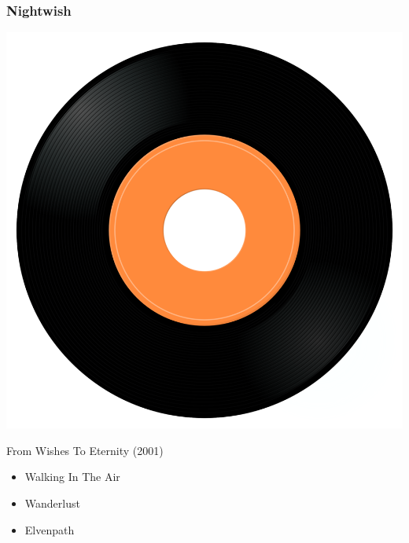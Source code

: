\subsubsection{Nightwish}

\begin{minipage}[t]{0.25\textwidth}
\captionsetup{type=figure}
\includegraphics[width=\textwidth]{Images/cover.png}
\caption*{From Wishes To Eternity (2001)}
\end{minipage}
\begin{minipage}[t]{0.25\textwidth}\vspace{0pt}
\begin{itemize}[nosep,leftmargin=1em,labelwidth=*,align=left]
	\setlength{\itemsep}{0pt}
	\item Walking In The Air
	\item Wanderlust
	\item Elvenpath
\end{itemize}
\end{minipage}

